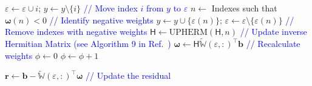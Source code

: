 \documentclass[11pt]{article}
\renewcommand{\vec}[1]{\mathbf{#1}}
\newcommand{\mat}[1]{\mathsf{#1}}
\begin{document}
\begin{algorithm}[H]
\begin{algorithmic} [1]
                        \STATE $\varepsilon \leftarrow \varepsilon \cup i$; $y\leftarrow y \setminus \{i\}$ \textcolor{blue}{// Move index $i$ from $y$ to $\varepsilon$}
                        \STATE $n \leftarrow$ Indexes such that $\boldsymbol\omega(n) < 0$ \textcolor{blue}{// Identify negative weights}
                        \STATE $y\leftarrow y \cup \{\varepsilon(n)\}$; $\varepsilon \leftarrow \varepsilon \setminus \{\varepsilon(n)\}$ \textcolor{blue}{// Remove indexes with negative weights}
                        \STATE $\mat{H}\leftarrow \text{UPHERM}(\mat{H}, n)$ \textcolor{blue}{// Update inverse Hermitian Matrix (see Algorithm 9 in Ref.~\cite{bravo2024subspace})}
                        \STATE $\boldsymbol\omega \leftarrow \mat{H}\widetilde{\mathbb{W}}(\varepsilon, :)^\top \vec{b}$ \textcolor{blue}{// Recalculate weights}
                            \STATE $\phi \leftarrow 0$
                        \ELSE
                            \STATE $\phi \leftarrow \phi + 1$
                        \ENDIF

                        \STATE $\vec{r} \leftarrow \vec{b} - \widetilde{\mathbb{W}}(\varepsilon, :)^\top \boldsymbol\omega$ \textcolor{blue}{// Update the residual}
                    \ENDWHILE
                \end{algorithmic}
            \end{algorithm}
\end{document}

